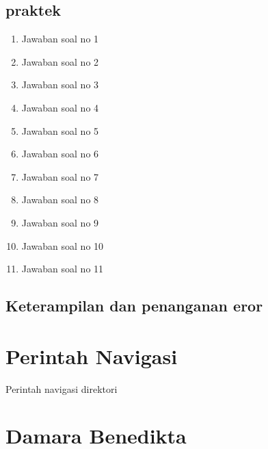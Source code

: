 \subsection{praktek}
\begin{enumerate}
    \item Jawaban soal no 1
    
    \item Jawaban soal no 2
    
    \item Jawaban soal no 3
    
    \item Jawaban soal no 4
    
    \item Jawaban soal no 5
    
    \item Jawaban soal no 6
    
    \item Jawaban soal no 7
    
    \item Jawaban soal no 8
    
    \item Jawaban soal no 9
    
    \item Jawaban soal no 10
    
    \item Jawaban soal no 11
    
\end{enumerate}

\subsection{Keterampilan dan penanganan eror}
    
\section{Perintah Navigasi}
Perintah navigasi direktori
\section{Damara Benedikta}
